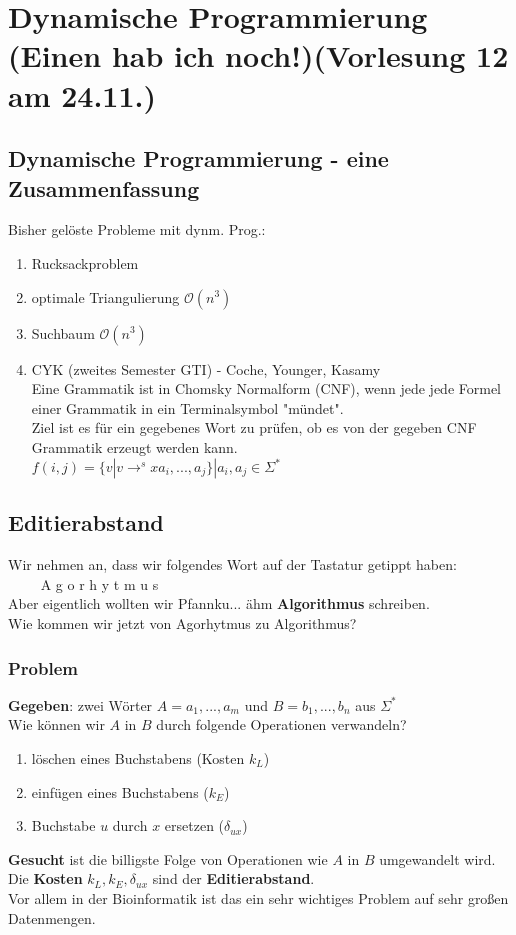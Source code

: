 \section{Dynamische Programmierung (Einen hab ich noch!)\tiny (Vorlesung 12 am 24.11.)}
\subsection{Dynamische Programmierung - eine Zusammenfassung}
Bisher gelöste Probleme mit dynm. Prog.:
\begin{enumerate}
\item Rucksackproblem
\item optimale Triangulierung $\mathcal{O}(n^3)$
\item Suchbaum $\mathcal{O}(n^3)$
\item CYK (zweites Semester GTI) - Coche, Younger, Kasamy\\
Eine Grammatik ist in Chomsky Normalform (CNF), wenn jede jede Formel einer Grammatik in ein Terminalsymbol "mündet".\\
Ziel ist es für ein gegebenes Wort zu prüfen, ob es von der gegeben CNF Grammatik erzeugt werden kann.\\
$f(i,j) = \{ v | v \rightarrow^s{x} a_i,...,a_j\} | a_i, a_j \in \Sigma^*$
\end{enumerate}
\subsection{Editierabstand}
Wir nehmen an, dass wir folgendes Wort auf der Tastatur getippt haben:\\
$\quad \quad $ A g o r h y t m u s\\
Aber eigentlich wollten wir Pfannku... ähm \textbf{Algorithmus} schreiben.\\ 
Wie kommen wir jetzt von Agorhytmus zu Algorithmus?\\
\subsubsection{Problem}
\textbf{Gegeben}: zwei Wörter $A = a_1,...,a_m$ und $B = b_1,...,b_n$ aus $\Sigma^*$\\
Wie können wir $A$ in $B$ durch folgende Operationen verwandeln?
\begin{enumerate}
\item löschen eines Buchstabens (Kosten $k_L$)
\item einfügen eines Buchstabens ($k_E$)
\item Buchstabe $u$ durch $x$ ersetzen ($\delta_{ux}$)
\end{enumerate}
\textbf{Gesucht} ist die billigste Folge von Operationen wie $A$ in $B$ umgewandelt wird.\\
Die \textbf{Kosten} $k_L, k_E, \delta_{ux}$ sind der \textbf{Editierabstand}.\\
Vor allem in der Bioinformatik ist das ein sehr wichtiges Problem auf sehr großen Datenmengen.\\
